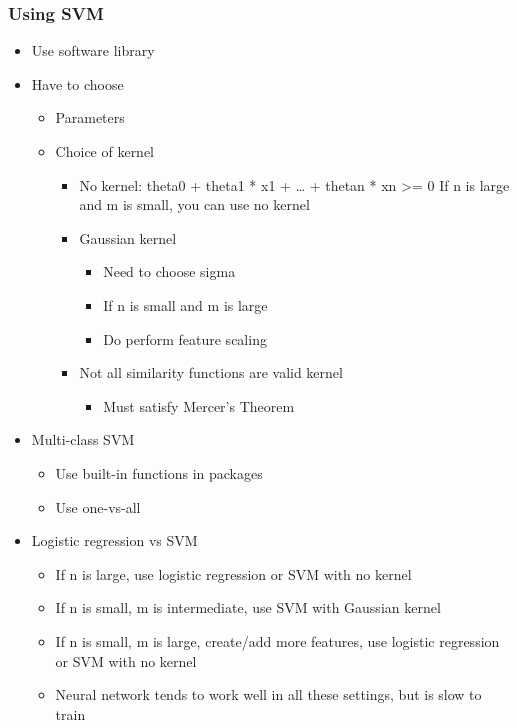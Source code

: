 \documentclass[]{article}
\providecommand{\tightlist}{%
  \setlength{\itemsep}{0pt}\setlength{\parskip}{0pt}}
\begin{document}
\hypertarget{using-svm}{%
\subsubsection{Using SVM}\label{using-svm}}

\begin{itemize}
\tightlist
\item
  Use software library
\item
  Have to choose

  \begin{itemize}
  \tightlist
  \item
    Parameters
  \item
    Choice of kernel

    \begin{itemize}
    \tightlist
    \item
      No kernel: theta0 + theta1 * x1 + \ldots{} + thetan * xn
      \textgreater{}= 0 If n is large and m is small, you can use no
      kernel
    \item
      Gaussian kernel

      \begin{itemize}
      \tightlist
      \item
        Need to choose sigma
      \item
        If n is small and m is large
      \item
        Do perform feature scaling
      \end{itemize}
    \item
      Not all similarity functions are valid kernel

      \begin{itemize}
      \tightlist
      \item
        Must satisfy Mercer's Theorem
      \end{itemize}
    \end{itemize}
  \end{itemize}
\item
  Multi-class SVM

  \begin{itemize}
  \tightlist
  \item
    Use built-in functions in packages
  \item
    Use one-vs-all
  \end{itemize}
\item
  Logistic regression vs SVM

  \begin{itemize}
  \tightlist
  \item
    If n is large, use logistic regression or SVM with no kernel
  \item
    If n is small, m is intermediate, use SVM with Gaussian kernel
  \item
    If n is small, m is large, create/add more features, use logistic
    regression or SVM with no kernel
  \item
    Neural network tends to work well in all these settings, but is slow
    to train
  \end{itemize}
\end{itemize}
\end{document}
